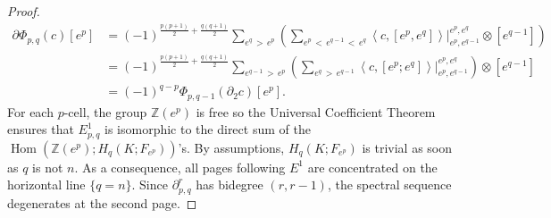 \documentclass[10pt]{amsart}
\theoremstyle{definition}
\numberwithin{equation}{section}
\numberwithin{figure}{section}
\newcommand{\Z}{\mathbb{Z}}
\DeclareMathOperator{\Hom}{Hom}
\begin{document}
\begin{proof}
\begin{align*}
\partial\Phi_{p,q}(c)[e^p] & =(-1)^{\frac{p(p+1)}{2}+\frac{q(q+1)}{2}} \sum_{e^q\,>\,e^p} \left(\sum_{e^p\,<\,e^{q-1}\,<\,e^q} \left\langle c,[e^p,e^q]\right\rangle \Big|^{e^p,e^q}_{e^p,e^{q-1}}\otimes\left[e^{q-1}\right] \right) \\
& = (-1)^{\frac{p(p+1)}{2}+\frac{q(q+1)}{2}} \sum_{e^{q-1}\,>\,e^p}\left(\sum_{e^q\,>\,e^{q-1}} \left\langle c, [e^p;e^q]\right\rangle \Big|^{e^p,e^q}_{e^p,e^{q-1}}\right)\otimes\left[e^{q-1}\right] \\ & = (-1)^{q-p}\Phi_{p,q-1}(\partial_2c)[e^p].
\end{align*}
For each $p$-cell, the group $\Z(e^p)$ is free so the Universal Coefficient Theorem ensures that $E^1_{p,q}$ is isomorphic to the direct sum of the $\Hom(\Z(e^p);H_q(K;F_{e^p}))$'s. By assumptions, $H_q(K;F_{e^p})$ is trivial as soon as $q$ is not $n$. As a consequence, all pages following $E^1$ are concentrated on the horizontal line $\{q=n\}$. Since $\partial^r_{p,q}$ has bidegree $(r,r-1)$, the spectral sequence degenerates at the second page.
\end{proof}
\end{document}
